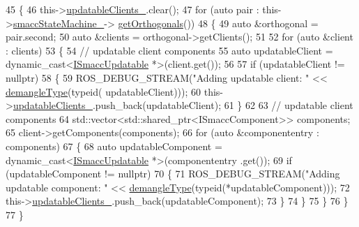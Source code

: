 \begin{DoxyCode}
45     \{
46         this->\hyperlink{classsmacc_1_1SignalDetector_a01a457b4ec935473d6426efb7b87e683}{updatableClients\_}.clear();
47         \textcolor{keywordflow}{for} (\textcolor{keyword}{auto} pair : this->\hyperlink{classsmacc_1_1SignalDetector_a46025de6ac7b5980e22144f9703236a4}{smaccStateMachine\_}->
      \hyperlink{classsmacc_1_1ISmaccStateMachine_a7f5b2882dbd077584767cb2533ed3c49}{getOrthogonals}())
48         \{
49             \textcolor{keyword}{auto} &orthogonal = pair.second;
50             \textcolor{keyword}{auto} &clients = orthogonal->getClients();
51 
52             \textcolor{keywordflow}{for} (\textcolor{keyword}{auto} &client : clients)
53             \{
54                 \textcolor{comment}{// updatable client components}
55                 \textcolor{keyword}{auto} updatableClient = \textcolor{keyword}{dynamic\_cast<}\hyperlink{classISmaccUpdatable}{ISmaccUpdatable} *\textcolor{keyword}{>}(client.get());
56 
57                 \textcolor{keywordflow}{if} (updatableClient != \textcolor{keyword}{nullptr})
58                 \{
59                     ROS\_DEBUG\_STREAM(\textcolor{stringliteral}{"Adding updatable client: "} << \hyperlink{namespacesmacc_1_1introspection_a670e39ccea29952859df4e2d0e45077b}{demangleType}(\textcolor{keyword}{typeid}(
      updatableClient)));
60                     this->\hyperlink{classsmacc_1_1SignalDetector_a01a457b4ec935473d6426efb7b87e683}{updatableClients\_}.push\_back(updatableClient);
61                 \}
62 
63                 \textcolor{comment}{// updatable client components}
64                 std::vector<std::shared\_ptr<ISmaccComponent>> components;
65                 client->getComponents(components);
66                 \textcolor{keywordflow}{for} (\textcolor{keyword}{auto} &componententry : components)
67                 \{
68                     \textcolor{keyword}{auto} updatableComponent = \textcolor{keyword}{dynamic\_cast<}\hyperlink{classISmaccUpdatable}{ISmaccUpdatable} *\textcolor{keyword}{>}(componententry
      .get());
69                     \textcolor{keywordflow}{if} (updatableComponent != \textcolor{keyword}{nullptr})
70                     \{
71                         ROS\_DEBUG\_STREAM(\textcolor{stringliteral}{"Adding updatable component: "} << 
      \hyperlink{namespacesmacc_1_1introspection_a670e39ccea29952859df4e2d0e45077b}{demangleType}(\textcolor{keyword}{typeid}(*updatableComponent)));
72                         this->\hyperlink{classsmacc_1_1SignalDetector_a01a457b4ec935473d6426efb7b87e683}{updatableClients\_}.push\_back(updatableComponent);
73                     \}
74                 \}
75             \}
76         \}
77     \}
\end{DoxyCode}
